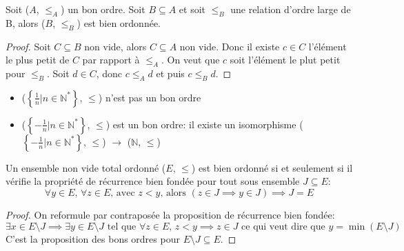 \begin{prop}
	Soit ($A$, $\leqslant_A$) un bon ordre. Soit $B \subseteq A$ et soit $\leqslant_B$ une relation d'ordre large de B, alors ($B$, $\leqslant_B$) est bien ordonnée.
\end{prop}

\begin{proof}

	Soit $C \subseteq B$ non vide, alors $C \subseteq A$ non vide. Donc il existe $c \in C$ l'élément le plus petit de $C$ par rapport à $\leqslant_A$. On
	veut que $c$ soit l'élément le plut petit pour $\leqslant_B$. Soit $d \in C$, donc $c \leqslant_A d$ et puis $c \leqslant_B d$.

\end{proof}

\begin{example}
	\begin{itemize}
		\item ($\left\{\frac{1}{n} | n \in \mathbb{N}^*\right\}$, $\leqslant$) n'est pas un bon ordre
		\item ($\left\{-\frac{1}{n} | n \in \mathbb{N}^*\right\}$, $\leqslant$) est un bon ordre: il existe un isomorphisme ($\left\{-\frac{1}{n} | n \in \mathbb{N}^*\right\}$, $\leqslant$) $\to$ ($\mathbb{N}$, $\leqslant$)
	\end{itemize}
\end{example}

\begin{prop}

	Un ensemble non vide total ordonné ($E$, $\leqslant$) est bien ordonné si et seulement si il vérifie la propriété de récurrence bien fondée pour tout sous ensemble $J \subseteq E$:
	\begin{equation*}
		\forall y \in E \text{, } \forall z \in E \text{, avec } z < y \text{, alors } (z \in J \implies y \in J) \implies J = E
	\end{equation*}
	\noindent

\end{prop}

\begin{proof}

	On reformule par contraposée la proposition de récurrence bien fondée:
	\begin{equation*}
		\exists x \in E\setminus J \implies \exists y \in E\setminus J \text{ tel que } \forall z \in E \text{, } z < y \implies z \in J \text{ ce qui veut dire que } y = \min(E\setminus J)
	\end{equation*}
	\noindent
	C'est la proposition des bons ordres pour $E\setminus J \subseteq E$.

\end{proof}

